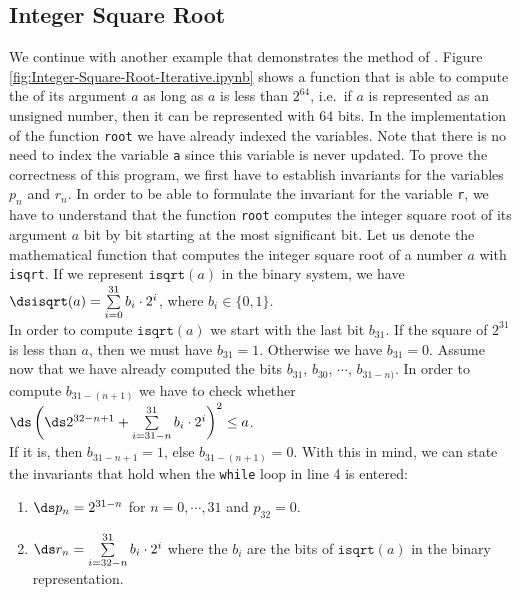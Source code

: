 \subsection{Integer Square Root}
We continue with another example that demonstrates the method of .
Figure \ref{fig:Integer-Square-Root-Iterative.ipynb} shows a function that is able to compute the
 of its argument $a$ as long as $a$ is less than $2^{64}$, i.e.~if $a$ is represented as an unsigned
number, then it can be represented with 64 bits.  In the implementation of the function \texttt{root} we have
already indexed the variables.  Note that there is no 
need to index the variable \texttt{a} since this variable is never updated.  To prove the correctness of this
program, we first 
have to establish invariants for the variables $p_n$ and $r_n$.  In order to be able to formulate the invariant
for the variable \texttt{r}, we have to understand that the function \texttt{root} computes the integer square
root of its argument $a$ bit by bit starting at the most significant bit.  Let us denote the
mathematical function that computes the integer square root of a number $a$ with \texttt{isqrt}.  If we
represent $\mathtt{isqrt}(a)$ in the binary system, we have
\\[0.2cm]
\hspace*{1.3cm}
$\ds \mathtt{isqrt}(a) = \sum\limits_{i=0}^{31} b_i \cdot 2^i$, \quad where $b_i \in \{0,1\}$.
\\[0.2cm]
In order to compute $\mathtt{isqrt}(a)$ we start with the last bit $b_{31}$.  If the square of $2^{31}$ is less
than $a$, then we must have $b_{31} = 1$.  Otherwise we have $b_{31} = 0$.  Assume now that we have already computed the
bits $b_{31}$, $b_{30}$, $\cdots$, $b_{31-n)}$.  In order to compute $b_{31-(n+1)}$ we have to check whether
\\[0.2cm]
\hspace*{1.3cm}
$\ds\left(\ds 2^{32-{n+1}} + \sum\limits_{i=31-n}^{31} b_i \cdot 2^i \right)^2 \leq a$.
\\[0.2cm]
If it is, then  $b_{31-{n+1}} = 1$, else $b_{31-(n+1)} = 0$.
With this in mind, we can state the invariants that hold when the \texttt{while} loop in line 4 is entered:
\begin{enumerate}
\item $\ds p_n = 2^{31 - n}$ \quad for $n=0,\cdots,31$ and $p_{32} = 0$.
\item $\ds r_n = \sum\limits_{i=32-n}^{31} b_i \cdot 2^i$ \quad where the $b_i$ are the bits of
      $\mathtt{isqrt}(a)$ in the binary representation.
\end{enumerate}

